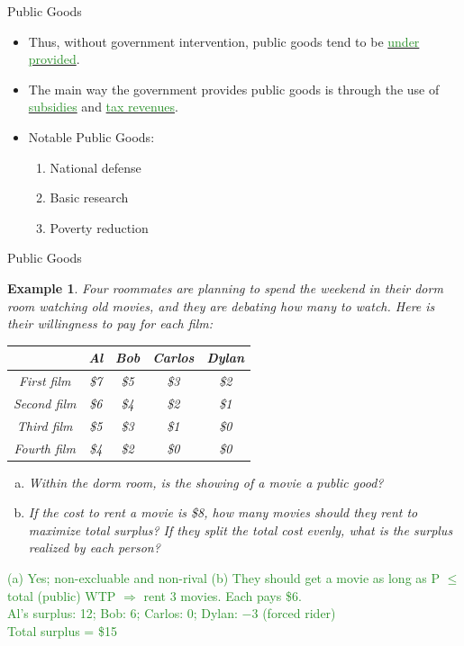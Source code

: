 \documentclass[xcolor={dvipsnames},pdf, hyperref={colorlinks=true, citecolor=ForestGreen, linkcolor=BlueViolet, urlcolor=Magenta}]{beamer}
\newtheorem{exmp}{Example}[section]
\newcommand{\ddp}[1]{{\textcolor{ForestGreen}{#1}}}
\newcommand{\dd}[1]{{\underline{\textcolor{ForestGreen}{#1}}}}
\begin{document}
\begin{frame}{Public Goods}
\begin{itemize}
			\item Thus, without government intervention, public goods tend to be \dd{under provided}.
			\item The main way the government provides public goods is through the use of \dd{subsidies} and \dd{tax revenues}.
			\item Notable Public Goods:
			\begin{enumerate}
				\item National defense 
				\item Basic research
				\item Poverty reduction
			\end{enumerate}
\end{itemize}
\end{frame}

\begin{frame}{Public Goods}
	\begin{exmp} \scriptsize
		Four roommates are planning to spend the weekend in their dorm room watching old movies, and they are debating how many to watch. Here is their willingness to pay for each film:
		
		
		\begin{table}[ht]
			\centering
			\begin{tabular}{ c|c|c|c|c }        
				
				& Al & Bob & Carlos & Dylan \\
				\hline
				First film & \$7 & \$5 & \$3 & \$2 \\
				Second film & \$6 & \$4 & \$2 & \$1 \\
				Third film & \$5 & \$3 & \$1 & \$0 \\
				Fourth film & \$4 & \$2 & \$0 & \$0 \\
			\end{tabular}
		\end{table} 
		
		\begin{enumerate}[a.]
			\item Within the dorm room, is the showing of a movie a public good?
			\item If the cost to rent a movie is \$8, how many movies should they rent to maximize total surplus? If they split the total cost evenly, what is the surplus realized by each person?
		\end{enumerate}
	\end{exmp}
\pause \scriptsize	\ddp{(a) Yes; non-excluable and non-rival (b)
	They should get a movie as long as P $\le$ total (public) WTP $\Rightarrow$ rent 3 movies. Each pays \$6. \\
	Al's surplus: 12; Bob:  6; Carlos: 0; Dylan: $-3$ (forced rider) \\
	Total surplus = \$15}
\end{frame}
\end{document}
